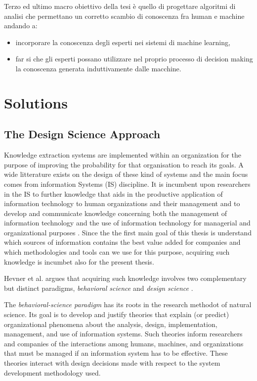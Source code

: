 \documentclass[]{book}
\providecommand{\tightlist}{%
  \setlength{\itemsep}{0pt}\setlength{\parskip}{0pt}}
\begin{document}
Terzo ed ultimo macro obiettivo della tesi è quello di progettare
algoritmi di analisi che permettano un corretto scambio di conoscenza
fra human e machine andando a:

\begin{itemize}
\tightlist
\item
  incorporare la conoscenza degli esperti nei sistemi di machine
  learning,
\item
  far si che gli esperti possano utilizzare nel proprio processo di
  decision making la conoscenza generata induttivamente dalle macchine.
\end{itemize}

\chapter{Solutions}\label{solutions}

\section{The Design Science Approach}\label{introdesres}

Knowledge extraction systems are implemented within an organization for
the purpose of improving the probability for that organisation to reach
its goals. A wide litterature exists on the design of these kind of
systems and the main focus comes from information Systems (IS)
discipline. It is incumbent upon researchers in the IS to further
knowledge that aids in the productive application of information
technology to human organizations and their management
\citep{edit2002info} and to develop and communicate knowledge concerning
both the management of information technology and the use of information
technology for managerial and organizational purposes
\citep{Zmud1997edit}. Since the the first main goal of this thesis is
understand which sources of information contains the best value added
for companies and which methodologies and tools can we use for this
purpose, acquiring such knowledge is incumbet also for the present
thesis.

Hevner et al. \citep{bichler2006design} argues that acquiring such
knowledge involves two complementary but distinct paradigms,
\emph{behavioral science} and \emph{design science}
\citep{march1995design}.

The \emph{behavioral-science paradigm} has its roots in the research
methodot of natural science. Its goal is to develop and justify theories
that explain (or predict) organizational phenomena about the analysis,
design, implementation, management, and use of information systems. Such
theories inform researchers and companies of the interactions among
humans, machines, and organizations that must be managed if an
information system has to be effective. These theories interact with
design decisions made with respect to the system development methodology
used.
\end{document}
